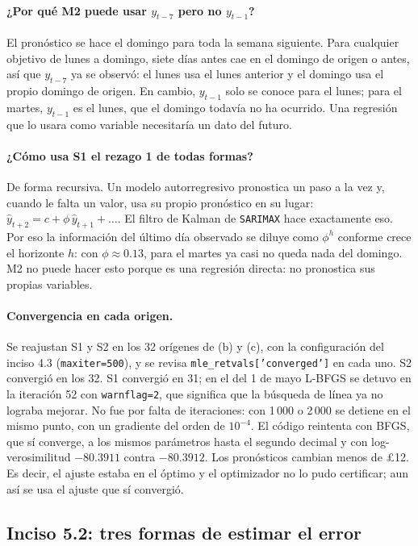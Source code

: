 \paragraph{¿Por qué M2 puede usar $y_{t-7}$ pero no $y_{t-1}$?} El
pronóstico se hace el domingo para toda la semana siguiente. Para cualquier
objetivo de lunes a domingo, siete días antes cae en el domingo de origen o
antes, así que $y_{t-7}$ ya se observó: el lunes usa el lunes anterior y el
domingo usa el propio domingo de origen. En cambio, $y_{t-1}$ solo se conoce
para el lunes; para el martes, $y_{t-1}$ es el lunes, que el domingo todavía
no ha ocurrido. Una regresión que lo usara como variable necesitaría un dato
del futuro.

\paragraph{¿Cómo usa S1 el rezago 1 de todas formas?} De forma recursiva. Un
modelo autorregresivo pronostica un paso a la vez y, cuando le falta un
valor, usa su propio pronóstico en su lugar: $\hat y_{t+2} = c + \phi\,\hat
y_{t+1} + \dots$. El filtro de Kalman de \texttt{SARIMAX} hace exactamente
eso. Por eso la información del último día observado se diluye como $\phi^h$
conforme crece el horizonte $h$: con $\phi\approx0.13$, para el martes ya casi
no queda nada del domingo. M2 no puede hacer esto porque es una regresión
directa: no pronostica sus propias variables.

\paragraph{Convergencia en cada origen.} Se reajustan S1 y S2 en los 32
orígenes de (b) y (c), con la configuración del inciso 4.3
(\texttt{maxiter=500}), y se revisa \texttt{mle\_retvals['converged']} en
cada uno. S2 convergió en los 32. S1 convergió en 31; en el del 1 de mayo
L-BFGS se detuvo en la iteración 52 con \texttt{warnflag=2}, que significa que
la búsqueda de línea ya no lograba mejorar. No fue por falta de iteraciones:
con 1\,000 o 2\,000 se detiene en el mismo punto, con un gradiente del orden
de $10^{-4}$. El código reintenta con BFGS, que sí converge, a los mismos
parámetros hasta el segundo decimal y con log-verosimilitud $-80.3911$ contra
$-80.3912$. Los pronósticos cambian menos de \pounds12. Es decir, el ajuste
estaba en el óptimo y el optimizador no lo pudo certificar; aun así se usa el
ajuste que sí convergió.

\subsection{Inciso 5.2: tres formas de estimar el error}

